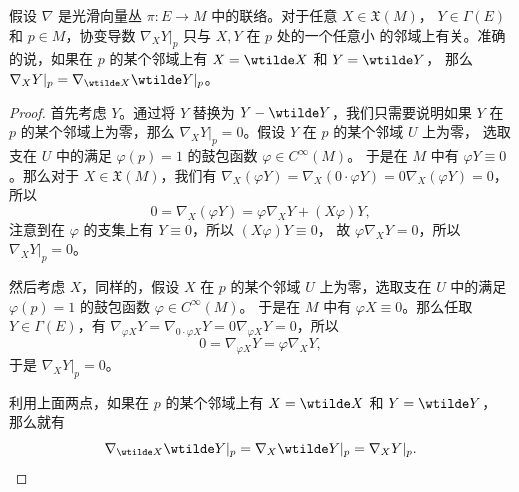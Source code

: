 \begin{lemma}[局部性]\label{lemma:locality of connection}
  假设 $\nabla$ 是光滑向量丛 $\pi:E\to M$ 中的联络。对于任意 $X\in \mathfrak{X}(M)$，
  $Y\in \Gamma(E)$ 和 $p\in M$，协变导数 $\nabla_XY|_p$ 只与 $X,Y$ 在 $p$ 处的一个任意小
  的邻域上有关。准确的说，如果在 $p$ 的某个邻域上有 $X=\wtilde X$ 和 $Y=\wtilde Y$，
  那么 $\nabla_XY|_p=\nabla_{\wtilde X}\wtilde Y|_p$。
\end{lemma}
\begin{proof}
  首先考虑 $Y$。通过将 $Y$ 替换为 $Y-\wtilde Y$，我们只需要说明如果 $Y$ 在 $p$
  的某个邻域上为零，那么 $\nabla_XY|_p=0$。假设 $Y$ 在 $p$ 的某个邻域 $U$ 上为零，
  选取支在 $U$ 中的满足 $\varphi(p)=1$ 的鼓包函数 $\varphi\in C^\infty(M)$。
  于是在 $M$ 中有 $\varphi Y\equiv 0$。那么对于 $X\in \mathfrak{X}(M)$，我们有
  $\nabla_X(\varphi Y)=\nabla_X(0\cdot \varphi Y)=0\nabla_X(\varphi Y)=0$，
  所以
  \[
    0=\nabla_X(\varphi Y)=\varphi\nabla_XY+(X\varphi)Y,  
  \]
  注意到在 $\varphi$ 的支集上有 $Y\equiv 0$，所以 $(X\varphi)Y\equiv 0$，
  故 $\varphi\nabla_XY=0$，所以 $\nabla_XY|_p=0$。

  然后考虑 $X$，同样的，假设 $X$ 在 $p$ 的某个邻域 $U$ 上为零，选取支在 $U$ 中的满足 $\varphi(p)=1$ 的鼓包函数 $\varphi\in C^\infty(M)$。
  于是在 $M$ 中有 $\varphi X\equiv 0$。那么任取 $Y\in\Gamma(E)$，有
  $\nabla_{\varphi X}Y=\nabla_{0\cdot\varphi X}Y=0\nabla_{\varphi X}Y=0$，所以
  \[
    0=\nabla_{\varphi X}Y=\varphi\nabla_XY,  
  \]
  于是 $\nabla_XY|_p=0$。

  利用上面两点，如果在 $p$ 的某个邻域上有 $X=\wtilde X$ 和 $Y=\wtilde Y$，
  那么就有
  \[
    \nabla_{\wtilde X}\wtilde Y|_p
    =  \nabla_{X}\wtilde Y|_p=
    \nabla_XY|_p.\qedhere
  \]
\end{proof}
 
